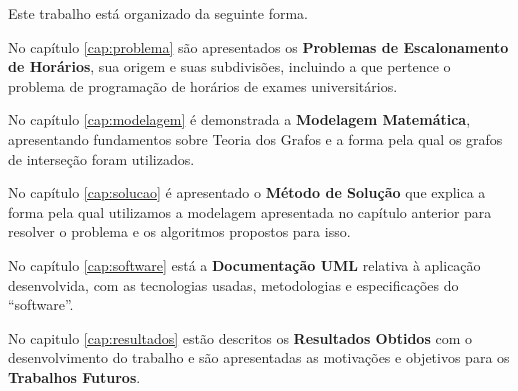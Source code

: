 



Este trabalho está organizado da seguinte forma.

No capítulo \ref{cap:problema} são apresentados os \textbf{Problemas de Escalonamento de Horários}, sua origem e suas subdivisões, incluindo a que pertence o problema de programação de horários de exames universitários.

No capítulo \ref{cap:modelagem} é demonstrada a \textbf{Modelagem Matemática}, apresentando fundamentos sobre Teoria dos Grafos e a forma pela qual os grafos de interseção foram utilizados.

No capítulo \ref{cap:solucao} é apresentado o \textbf{Método de Solução} que explica a forma pela qual utilizamos a modelagem apresentada no capítulo anterior para resolver o problema e os algoritmos propostos para isso.

No capítulo \ref{cap:software} está a \textbf{Documentação UML} relativa à aplicação desenvolvida, com as tecnologias usadas, metodologias e especificações do “software”.

No capitulo \ref{cap:resultados} estão descritos os \textbf{Resultados Obtidos} com o desenvolvimento do trabalho e são apresentadas as motivações e objetivos para os \textbf{Trabalhos Futuros}.

